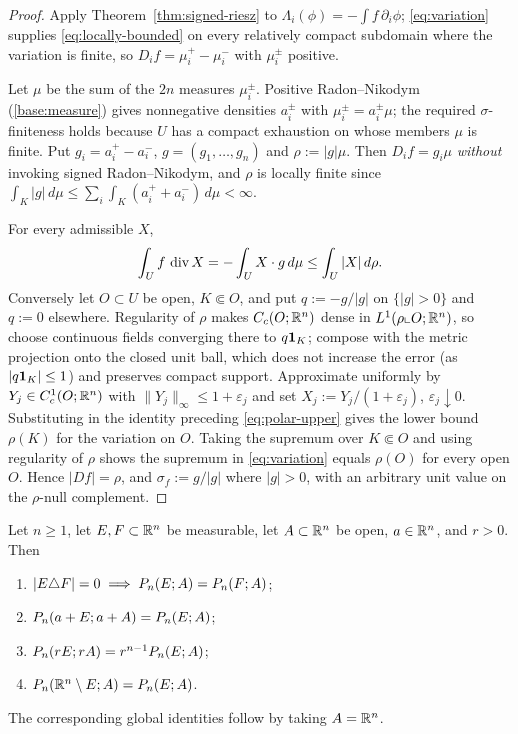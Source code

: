 \begin{proof}
Apply Theorem~\ref{thm:signed-riesz} to
$\Lambda_i(\phi)=-\int f\,\partial_i\phi$; \eqref{eq:variation} supplies
\eqref{eq:locally-bounded} on every relatively compact subdomain where the
variation is finite, so $D_if=\mu_i^+-\mu_i^-$ with $\mu_i^\pm$ positive.

Let $\mu$ be the sum of the $2n$ measures $\mu_i^\pm$.  Positive
Radon--Nikodym (\ref{base:measure}) gives nonnegative densities $a_i^\pm$
with $\mu_i^\pm=a_i^\pm\mu$; the required $\sigma$-finiteness holds because
$U$ has a compact exhaustion on whose members $\mu$ is finite.  Put
$g_i=a_i^+-a_i^-$, $g=(g_1,\ldots,g_n)$ and $\rho:=|g|\mu$.  Then $D_if=g_i\mu$
\emph{without} invoking signed Radon--Nikodym, and $\rho$ is locally finite
since $\int_K|g|\,d\mu\le\sum_i\int_K(a_i^++a_i^-)\,d\mu<\infty$.

For every admissible $X$,
\begin{equation}\label{eq:polar-upper}
  \int_Uf\,\operatorname{div} X=-\int_UX\cdot g\,d\mu\le\int_U|X|\,d\rho .
\end{equation}
Conversely let $O\subset U$ be open, $K\Subset O$, and put $q:=-g/|g|$ on
$\{|g|>0\}$ and $q:=0$ elsewhere.  Regularity of $\rho$ makes
$C_c(O;\mathbb R^n)$ dense in $L^1(\rho\llcorner O;\mathbb R^n)$, so choose continuous
fields converging there to $q\mathbf 1_{K}$; compose with the metric projection onto
the closed unit ball, which does not increase the error (as $|q\mathbf 1_{K}|\le1$)
and preserves compact support.  Approximate uniformly by
$Y_j\in C^1_c(O;\mathbb R^n)$ with $\|Y_j\|_\infty\le1+\varepsilon_j$ and set
$X_j:=Y_j/(1+\varepsilon_j)$, $\varepsilon_j\downarrow0$.  Substituting in
the identity preceding \eqref{eq:polar-upper} gives the lower bound
$\rho(K)$ for the variation on $O$.  Taking the supremum over $K\Subset O$
and using regularity of $\rho$ shows the supremum in \eqref{eq:variation}
equals $\rho(O)$ for every open $O$.  Hence $|Df|=\rho$, and
$\sigma_f:=g/|g|$ where $|g|>0$, with an arbitrary unit value on the
$\rho$-null complement.
\end{proof}

\begin{lemma}\label{lem:perimeter-invariances}
Let $n\ge1$, let $E,F\subset\mathbb R^n$ be measurable, let $A\subset\mathbb R^n$ be
open, $a\in\mathbb R^n$, and $r>0$.  Then
\begin{enumerate}[label=(\roman*)]
\item\label{it:per-null} $|E\triangle F|=0\implies
  P_n(E;A)=P_n(F;A)$;
\item\label{it:per-transl}
  $P_n(a+E;a+A)=P_n(E;A)$;
\item\label{it:per-dil}
  $P_n(rE;rA)=r^{n-1}P_n(E;A)$;
\item\label{it:per-compl}
  $P_n(\mathbb R^n\setminus E;A)=P_n(E;A)$.
\end{enumerate}
The corresponding global identities follow by taking $A=\mathbb R^n$.
\end{lemma}

